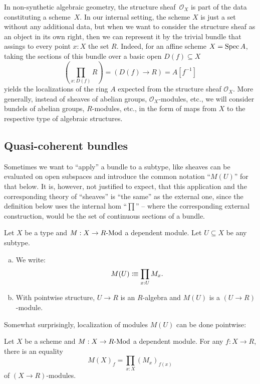 In non-synthetic algebraic geometry,
the structure sheaf~$\mathcal{O}_X$ is part of the data constituting a scheme~$X$.
In our internal setting,
the scheme $X$ is just a set without any additional data,
but when we want to consider the structure sheaf as an object in its own right,
then we can represent it by the trivial bundle
that assings to every point $x : X$ the set $R$.
Indeed, for an affine scheme $X = \operatorname{Spec} A$,
taking the sections of this bundle over a basic open $D(f) \subseteq X$
\[ \left(\prod_{x : D(f)} R\right) = (D(f) \to R) = A[f^{-1}] \]
yields the localizations of the ring $A$
expected from the structure sheaf $\mathcal{O}_X$.
More generally,
instead of sheaves of abelian groups, $\mathcal{O}_X$-modules, etc.,
we will consider bundels of abelian groups, $R$-modules, etc.,
in the form of maps from $X$ to the respective type of algebraic structures.

\subsection{Quasi-coherent bundles}

Sometimes we want to ``apply'' a bundle to a subtype,
like sheaves can be evaluated on open subspaces
and introduce the common notation ``$M(U)$'' for that below.
It is, however, not justified to expect, that this application
and the corresponding theory of ``sheaves'' is ``the same'' as the external one,
since the definition below uses the internal hom ``$\prod$''
-- where the corresponding external construction, would be the set of continuous sections of a bundle.

\begin{definition}
  \label{application-of-bundle-to-subtype}
  Let $X$ be a type and $M:X\to R\text{-}\mathrm{Mod}$ a dependent module.
  Let $U\subseteq X$ be any subtype.
  \begin{enumerate}[(a)]
  \item We write:
    \[
      M(U)\colonequiv \prod_{x:U}M_x
      \rlap{.}
    \]
  \item With pointwise structure, $U\to R$ is an $R$-algebra
    and $M(U)$ is a $(U\to R)$-module.
  \end{enumerate}
\end{definition}

Somewhat surprisingly, localization of modules $M(U)$
can be done pointwise:

\begin{lemma}%
  \label{module-bundle-localization-pointwise}
  Let $X$ be a scheme and $M:X\to R\text{-}\mathrm{Mod}$ a dependent module.
  For any $f:X\to R$, there is an equality
  \[
    M(X)_f=\prod_{x:X}(M_x)_{f(x)}
  \]
  of $(X\to R)$-modules.
\end{lemma}

